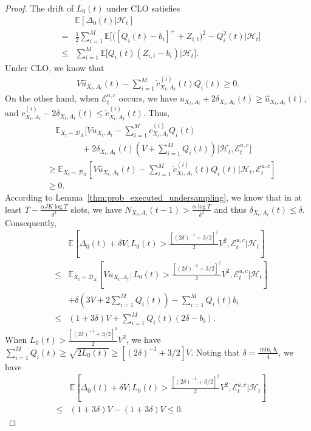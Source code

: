 \begin{proof}
The drift of $L_0(t)$ under CLO satisfies
\begin{eqnarray} \label{eq:L0_drift_bound}
&& \mathbb{E}[\Delta_0(t) | \mathcal{H}_t] \nonumber \\
&=& \frac{1}{2} \sum_{i = 1}^M \mathbb{E}\big[ \big([Q_i(t) - b_i]^+ + Z_{i,t}\big)^2 - Q^2_i(t)\big| \mathcal{H}_t\big] \nonumber \\
&\leq & \sum_{i = 1}^M \mathbb{E}\big[Q_i(t)(Z_{i,t} - b_i) \big| \mathcal{H}_t\big].
\end{eqnarray}
Under CLO, we know that
\begin{eqnarray}
V \hat{u}_{X_t, A_t}(t) - \sum_{i = 1}^M \check{c}_{X_t, A_t}^{(i)}(t) Q_i(t)  \geq 0.
\end{eqnarray}
On the other hand, when $\mathcal{E}^{u,c}_{t}$ occurs, we have $u_{X_t, A_t} + 2 \delta_{X_t, A_t} (t) \geq \hat{u}_{X_t, A_t}(t)$,
and $c^{(i)}_{X_t, A_t} - 2 \delta_{X_t, A_t} (t) \leq \check{c}_{X_t, A_t}^{(i)}(t)$.
Thus,
\begin{align}
&\quad \mathbb{E}_{X_t \sim \mathcal{D}_X} [V u_{X_t, A_t} - \sum_{i = 1}^M {c}_{X_t, A_t}^{(i)} Q_i(t)  \nonumber \\
& \quad ~~~~~~~~~~~~~~ + 2\delta _{X_t, A_t}(t)(V + \sum_{i = 1}^M Q_i(t)) |\mathcal{H}_t, \mathcal{E}^{u,c}_{t}] \nonumber \\
&\geq  \mathbb{E}_{X_t \sim \mathcal{D}_X} [V \hat{u}_{X_t, A_t}(t) - \sum_{i = 1}^M \check{c}_{X_t, A_t}^{(i)}(t) Q_i(t)  |\mathcal{H}_t, \mathcal{E}^{u,c}_{t}]  \nonumber \\
&\geq 0.
\end{align}
According to Lemma~\ref{thm:prob_executed_undersampling}, we know that in at least $T - \frac{\alpha JK \log T}{\delta^2}$  slots,
we have $N_{X_t,A_t}(t-1) > \frac{\alpha \log T}{\delta^2}$ and thus $\delta _{X_t, A_t}(t) \leq \delta$.  Consequently,
\begin{eqnarray}
&& \mathbb{E}[\Delta_0(t) + \delta V; L_0(t) > \frac{[(2\delta)^{-1} + 3/2]^2}{2} V^2, \mathcal{E}^{u,c}_{t} | \mathcal{H}_t] \nonumber \\
& \leq& \mathbb{E}_{X_t \sim \mathcal{D}_X} [V u_{X_t, A_t}; L_0(t) > \frac{[(2\delta)^{-1} + 3/2]^2}{2} V^2,  \mathcal{E}^{u,c}_{t} | \mathcal{H}_t]  \nonumber \\
&&+ \delta (3V + 2\sum_{i = 1}^M Q_i(t)) - \sum_{i = 1}^M Q_i(t)b_i \nonumber \\
&\leq & (1 + 3\delta) V + \sum_{i = 1}^M Q_i(t) (2 \delta - b_i).
\end{eqnarray}
When $L_0(t) > \frac{[(2\delta)^{-1} + 3/2]^2}{2} V^2$, we have $\sum_{i = 1}^M Q_i(t) \geq \sqrt{2L_0(t)} \geq [(2\delta)^{-1} + 3/2]V$. Noting that $\delta = \frac{\min_i b_i} {4}$, we have
\begin{eqnarray}
&& \mathbb{E}[\Delta_0(t) + \delta V; L_0(t) > \frac{[(2\delta)^{-1} + 3/2]^2}{2} V^2,  \mathcal{E}^{u,c}_{t} | \mathcal{H}_t]  \nonumber \\
&\leq& (1 + 3\delta) V - (1 + 3\delta)V \leq 0.
\end{eqnarray}
\end{proof}


